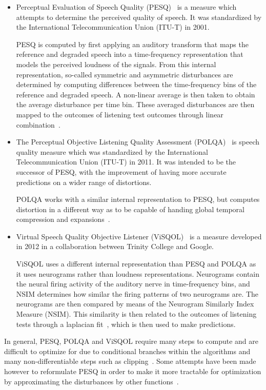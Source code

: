 \begin{itemize}
    \item 
    Perceptual Evaluation of Speech Quality (PESQ)~\cite{rix2001perceptual}
    is a measure which attempts to determine the perceived quality of speech.
    It was standardized by the International Telecommunication Union (ITU-T) in 2001.

    PESQ is computed by first applying an auditory transform that maps the reference and degraded speech into a 
    time-frequency representation that models the perceived loudness of the signals.
    From this internal representation, so-called symmetric and asymmetric disturbances are determined 
    by computing differences between the time-frequency bins of the reference and degraded speech. 
    A non-linear average is then taken to obtain the average disturbance per time bin.
    These averaged disturbances are then mapped to the outcomes of listening test outcomes through linear 
    combination~\cite{rix2001perceptual}.

    \item
    The Perceptual Objective Listening Quality Assessment (POLQA)~\cite{beerends2013perceptual} 
    is speech quality measure which was standardized by the International Telecommunication Union (ITU-T) in 2011. 
    It was intended to be the successor of PESQ, with the improvement of having more accurate predictions on a 
    wider range of distortions.

    POLQA works with a similar internal representation to PESQ, but computes distortion in a different way 
    as to be capable of handing global temporal compression and expansions~\cite{beerends2013perceptual}.

    \item
    Virtual Speech Quality Objective Listener (ViSQOL)~\cite{hines2012visqol,chinen2020visqol} 
    is a measure developed in 2012 in a collaboration between Trinity College and Google.

    ViSQOL uses a different internal representation than PESQ and POLQA as it uses neurograms 
    rather than loudness representations. 
    Neurograms contain the neural firing activity of the auditory nerve in time-frequency bins, 
    and NSIM determines how similar
    the firing patterns of two neurograms are.
    The neurograms are then compared by means of the Neurogram Similarly Index Measure (NSIM).
    This similarity is then related to the outcomes of listening tests through a laplacian fit~\cite{hines2012visqol}, 
    which is then used to make predictions.

\end{itemize}
In general, PESQ, POLQA and ViSQOL require many steps to compute and are difficult to optimize for due to 
conditional branches within the algorithms and many non-differentiable steps such as clipping~\cite{rix2001perceptual,beerends2013perceptual,hines2012visqol}. 
Some attempts have been made however to reformulate PESQ in order to make it more tractable for optimization 
by approximating the disturbances by other functions~\cite{kim2019end}.

